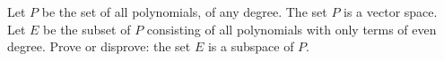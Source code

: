 Let $P$ be the set of all polynomials, of any degree.  The set $P$ is a vector space.  Let $E$ be the subset of $P$ consisting of all polynomials with only terms of even degree.  Prove or disprove:  the set $E$ is a subspace of $P$.
